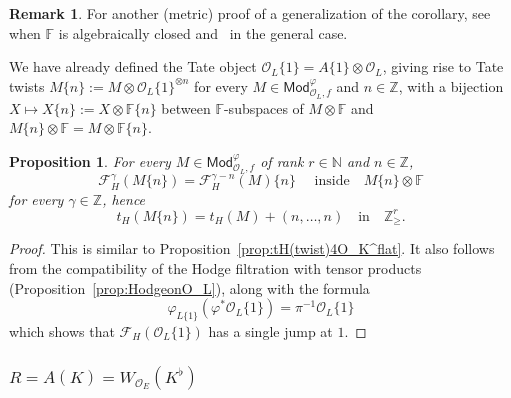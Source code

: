 \documentclass[11pt]{article}
\newtheorem{prop}[theo]{Proposition}
\theoremstyle{definition}
\newtheorem{rema}[theo]{Remark}
\numberwithin{equation}{section}
\numberwithin{figure}{section}
\numberwithin{table}{section}
\newcommand{\Mod}{\mathsf{Mod}}
\begin{document}
\begin{rema}
For another (metric) proof of a generalization of the corollary, see~\cite[Th\'eor\`eme~7]{CoNi16} when $\mathbb{F}$ is algebraically closed and~\cite[\S 3.2]{Co15} in the general case.
\end{rema}

We have already defined the Tate object $\mathcal{O}_{L}\{1\}=A\{1\}\otimes\mathcal{O}_{L}$, giving rise to Tate twists $M\{n\}:=M\otimes\mathcal{O}_{L}\{1\}^{\otimes n}$ for every $M\in\Mod_{\mathcal{O}_{L},f}^{\varphi}$ and $n\in\mathbb{Z}$, with a bijection~$X\mapsto X\{n\}:=X\otimes\mathbb{F}\{n\}$ between $\mathbb{F}$-subspaces of $M\otimes\mathbb{F}$ and $M\{n\}\otimes\mathbb{F}=M\otimes\mathbb{F}\{n\}$.

\begin{prop}\label{prop:tH(twist)4O_L}
For every $M\in\Mod_{\mathcal{O}_{L},f}^{\varphi}$ of rank $r\in\mathbb{N}$ and $n\in\mathbb{Z}$,
\[
\mathcal{F}_{H}^{\gamma}(M\{n\})=\mathcal{F}_{H}^{\gamma-n}(M)\{n\}\quad\text{ inside}\quad M\{n\}\otimes\mathbb{F}
\]
for every $\gamma\in\mathbb{Z}$, hence
\[
t_{H}(M\{n\})=t_{H}(M)+(n,\dots,n)\quad\text{in}\quad\mathbb{Z}_{\geq}^{r}.
\]
\end{prop}

\begin{proof}
This is similar to Proposition~\ref{prop:tH(twist)4O_K^flat}. It also follows from the compatibility of the Hodge filtration with tensor products (Proposition~\ref{prop:HodgeonO_L}), along with the formula
\[
\varphi_{L\{1\}}(\varphi^{\ast}\mathcal{O}_{L}\{1\})=\pi^{-1}\mathcal{O}_{L}\{1\}
\]
which shows that $\mathcal{F}_{H}(\mathcal{O}_{L}\{1\})$ has a single jump at $1$.
\end{proof}

\subsubsection{\texorpdfstring{${R=A(K)=W_{\mathcal{O}_{E}}(K^{\flat})}$}{R=A(K)=WOE(K flat)}}\label{subsec:RisW(Kflat)}
\end{document}

